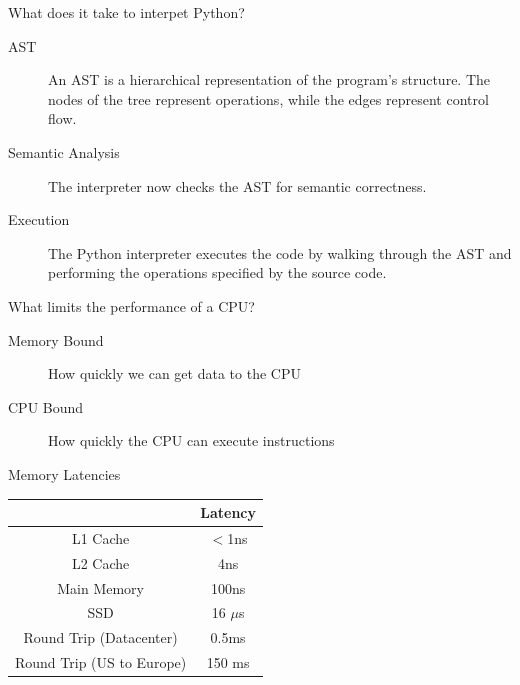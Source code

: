 \documentclass[12pt, aspectration=169]{beamer}
\begin{document}
    \begin{frame}{What does it take to interpet Python?}
        \begin{description}
            \item[AST] An AST is a hierarchical representation of the program's structure.
            The nodes of the tree represent operations, while the edges represent control flow.
            \item[Semantic Analysis] The interpreter now checks the AST for semantic correctness.
            \item[Execution] The Python interpreter executes the code by walking through the AST and performing the operations specified by the source code.
        \end{description}
    \end{frame}

    \begin{frame}{What limits the performance of a CPU?}
        \begin{description}
            \item[Memory Bound] How quickly we can get data to the CPU
            \item[CPU Bound] How quickly the CPU can execute instructions
        \end{description}
    \end{frame}

    \begin{frame}{Memory Latencies}
        \begin{center}
            \begin{tabular}{|c c|}
             \hline
              & Latency \\ [0.5ex]
             \hline\hline
             L1 Cache & $<$1ns \\
             \hline
             L2 Cache & 4ns \\
             \hline
             Main Memory & 100ns \\
             \hline
             SSD & 16 $\mu$s \\ [1ex]
             \hline
             Round Trip (Datacenter)   & 0.5ms     \\
             \hline
             Round Trip (US to Europe) & 150 ms \\ [1ex]
             \hline
            \end{tabular}
        \end{center}
    \end{frame}
\end{document}
